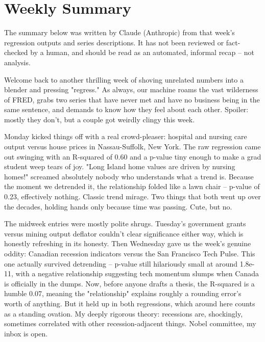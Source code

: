 \section{Weekly Summary}

\begin{tcolorbox}[colback=yellow!10,colframe=black!50,title=AI-Generated Content]
\noindent The summary below was written by Claude (Anthropic) from that week's regression outputs and series descriptions. It has not been reviewed or fact-checked by a human, and should be read as an automated, informal recap -- not analysis.
\end{tcolorbox}

Welcome back to another thrilling week of shoving unrelated numbers into a blender and pressing "regress." As always, our machine roams the vast wilderness of FRED, grabs two series that have never met and have no business being in the same sentence, and demands to know how they feel about each other. Spoiler: mostly they don't, but a couple got weirdly clingy this week.

Monday kicked things off with a real crowd-pleaser: hospital and nursing care output versus house prices in Nassau-Suffolk, New York. The raw regression came out swinging with an R-squared of 0.60 and a p-value tiny enough to make a grad student weep tears of joy. "Long Island home values are driven by nursing homes!" screamed absolutely nobody who understands what a trend is. Because the moment we detrended it, the relationship folded like a lawn chair -- p-value of 0.23, effectively nothing. Classic trend mirage. Two things that both went up over the decades, holding hands only because time was passing. Cute, but no.

The midweek entries were mostly polite shrugs. Tuesday's government grants versus mining output deflator couldn't clear significance either way, which is honestly refreshing in its honesty. Then Wednesday gave us the week's genuine oddity: Canadian recession indicators versus the San Francisco Tech Pulse. This one actually survived detrending -- p-value still hilariously small at around 1.8e-11, with a negative relationship suggesting tech momentum slumps when Canada is officially in the dumps. Now, before anyone drafts a thesis, the R-squared is a humble 0.07, meaning the "relationship" explains roughly a rounding error's worth of anything. But it held up in both regressions, which around here counts as a standing ovation. My deeply rigorous theory: recessions are, shockingly, sometimes correlated with other recession-adjacent things. Nobel committee, my inbox is open.


